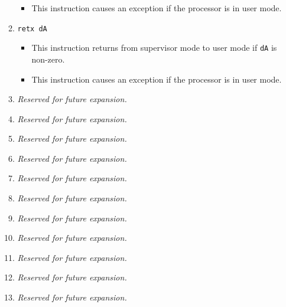\documentclass{article}
\begin{document}
\begin{itemize}
\begin{enumerate}
\begin{itemize}
				\item This instruction causes an exception if the processor
				is in user mode.
				\end{itemize}

			\item \texttt{retx dA}
				\begin{itemize}
				\item This instruction returns from supervisor mode to user
				mode if \texttt{dA} is non-zero.

				\item This instruction causes an exception if the processor
				is in user mode.
				\end{itemize}
			\item \textit{Reserved for future expansion.}
			\item \textit{Reserved for future expansion.}
			\item \textit{Reserved for future expansion.}

			\item \textit{Reserved for future expansion.}
			\item \textit{Reserved for future expansion.}
			\item \textit{Reserved for future expansion.}
			\item \textit{Reserved for future expansion.}

			\item \textit{Reserved for future expansion.}
			\item \textit{Reserved for future expansion.}
			\item \textit{Reserved for future expansion.}
			\item \textit{Reserved for future expansion.}
			\end{enumerate}
		\end{itemize}
		\newpage
\end{document}
